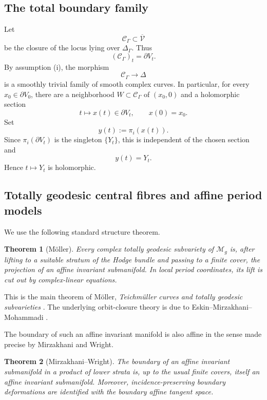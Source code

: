 \documentclass[11pt]{amsart}
\newtheorem{theorem}{Theorem}[section]
\theoremstyle{definition}
\theoremstyle{remark}
\newcommand{\M}{\mathcal M}
\newcommand{\DD}{\Delta}
\newcommand{\cV}{\mathcal V}
\newcommand{\cC}{\mathcal C}
\begin{document}
\subsection{The total boundary family}

Let
\[
\cC_\Gamma\subset \overline{\cV}
\]
be the closure of the locus lying over \(\Delta_\Gamma\). Thus
\[
(\cC_\Gamma)_t=\partial V_t .
\]
By assumption (i), the morphism
\[
\cC_\Gamma\longrightarrow\DD
\]
is a smoothly trivial family of smooth complex curves. In particular, for
every \(x_0\in\partial V_0\), there are a neighborhood
\(W\subset\cC_\Gamma\) of \((x_0,0)\) and a holomorphic section
\[
t\longmapsto x(t)\in\partial V_t,\qquad x(0)=x_0.
\]
Set
\[
y(t):=\pi_i(x(t)).
\]
Since \(\pi_i(\partial V_t)\) is the singleton \(\{Y_t\}\), this is
independent of the chosen section and
\[
y(t)=Y_t.
\]
Hence \(t\mapsto Y_t\) is holomorphic.

\subsection{Totally geodesic central fibres and affine period models}

We use the following standard structure theorem.

\begin{theorem}[M\"oller]\label{thm:Moller}
Every complex totally geodesic subvariety of \(\M_g\) is, after lifting to
a suitable stratum of the Hodge bundle and passing to a finite cover, the
projection of an affine invariant submanifold. In local period
coordinates, its lift is cut out by complex-linear equations.
\end{theorem}

This is the main theorem of M\"oller,
\emph{Teichm\"uller curves and totally geodesic subvarieties}
\cite[Theorem~1.1 and \S4]{Moller2008}. The underlying
orbit-closure theory is due to Eskin--Mirzakhani--Mohammadi
\cite{EMM2015}.

The boundary of such an affine invariant manifold is also affine in the
sense made precise by Mirzakhani and Wright.

\begin{theorem}[Mirzakhani--Wright]\label{thm:MWboundary}
The boundary of an affine invariant submanifold in a product of lower
strata is, up to the usual finite covers, itself an affine invariant
submanifold. Moreover, incidence-preserving boundary deformations are
identified with the boundary affine tangent space.
\end{theorem}
\end{document}
